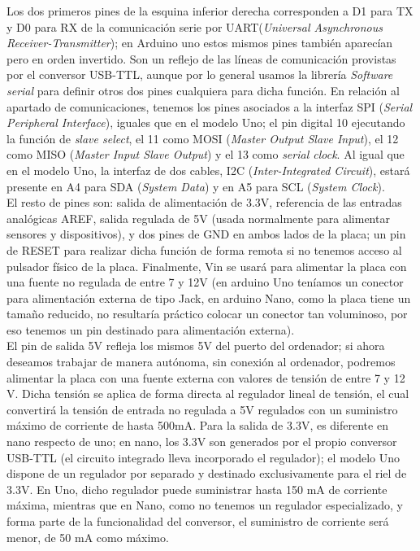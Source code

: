 \documentclass[12pt]{article}
\begin{document}
	\noindent Los dos primeros pines de la esquina inferior derecha corresponden a D1 para TX y D0 para RX de la comunicación serie por UART(\textit{Universal Asynchronous Receiver-Transmitter}); en Arduino uno estos mismos pines también aparecían pero en orden invertido. Son un reflejo de las líneas de comunicación provistas por el conversor USB-TTL, aunque por lo general usamos la librería \textit{Software serial} para definir otros dos pines cualquiera para dicha función. En relación al apartado de comunicaciones, tenemos los pines asociados a la interfaz SPI (\textit{Serial Peripheral Interface}), iguales que en el modelo Uno; el pin digital 10 ejecutando la función de \textit{slave select}, el 11 como MOSI (\textit{Master Output Slave Input}), el 12 como MISO (\textit{Master Input Slave Output}) y el 13 como \textit{serial clock}. Al igual que en el modelo Uno, la interfaz de dos cables, I2C (\textit{Inter-Integrated Circuit}), estará presente en A4 para SDA (\textit{System Data}) y en A5 para SCL (\textit{System Clock}). \\
	
		
	\noindent El resto de pines son: salida de alimentación de 3.3V, referencia de las entradas analógicas AREF, salida regulada de 5V (usada normalmente para alimentar sensores y dispositivos), y dos pines de GND en ambos lados de la placa; un pin de RESET para realizar dicha función de forma remota si no tenemos acceso al pulsador físico de la placa. Finalmente, Vin se usará para alimentar la placa con una fuente no regulada de entre 7 y 12V (en arduino Uno teníamos un conector para alimentación externa de tipo Jack, en arduino Nano, como la placa tiene un tamaño reducido, no resultaría práctico colocar un conector tan voluminoso, por eso tenemos un pin destinado para alimentación externa). \\
	
	
	\noindent El pin de salida 5V refleja los mismos 5V del puerto  del ordenador; si ahora deseamos trabajar de manera autónoma, sin conexión al ordenador, podremos alimentar la placa con una fuente externa con valores de tensión de entre 7 y 12 V. Dicha tensión se aplica de forma directa al regulador lineal de tensión, el cual convertirá la tensión de entrada no regulada a 5V regulados con un suministro máximo de corriente de hasta 500mA. Para la salida de 3.3V, es diferente en nano respecto de uno; en nano, los 3.3V son generados por el propio conversor USB-TTL (el circuito integrado lleva incorporado el regulador); el modelo Uno dispone de un regulador por separado y destinado exclusivamente para el riel de 3.3V. En Uno, dicho regulador puede suministrar hasta 150 mA de corriente máxima, mientras que en Nano, como no tenemos un regulador especializado, y forma parte de la funcionalidad del conversor, el suministro de corriente será menor, de 50 mA como máximo. \\
	
\end{document}
